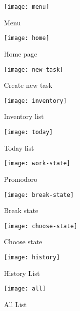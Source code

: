 \begin{center}
	\begin{figure}[h]
		\centering
		\texttt{[image: menu]}\\
		\caption{Menu}
		\label{run}
	\end{figure}
	
	\begin{figure}[h]
		\centering
		\texttt{[image: home]}\\
		\caption{Home page}
		\label{jump}
	\end{figure}
	
	\begin{figure}[h]
		\centering
		\texttt{[image: new-task]}\\
		\caption{Create new task}
		\label{slide}
	\end{figure}
	
	\begin{figure}[h]
		\centering
		\texttt{[image: inventory]}\\
		\caption{Inventory list}
		\label{lose}
	\end{figure}
	\begin{figure}[h]
		\centering
		\texttt{[image: today]}\\
		\caption{Today list}
		\label{jump}
	\end{figure}
	
	\begin{figure}[h]
		\centering
		\texttt{[image: work-state]}\\
		\caption{Promodoro}
		\label{slide}
	\end{figure}
	
	\begin{figure}[h]
		\centering
		\texttt{[image: break-state]}\\
		\caption{Break state}
		\label{lose}
	\end{figure}
	
	\begin{figure}[h]
		\centering
		\texttt{[image: choose-state]}\\
		\caption{Choose state}
		\label{jump}
	\end{figure}
	
	\begin{figure}[h]
		\centering
		\texttt{[image: history]}\\
		\caption{History List}
		\label{slide}
	\end{figure}
	
	\begin{figure}[h]
		\centering
		\texttt{[image: all]}\\
		\caption{All List}
		\label{slide}
	\end{figure}
\end{center}

\clearpage